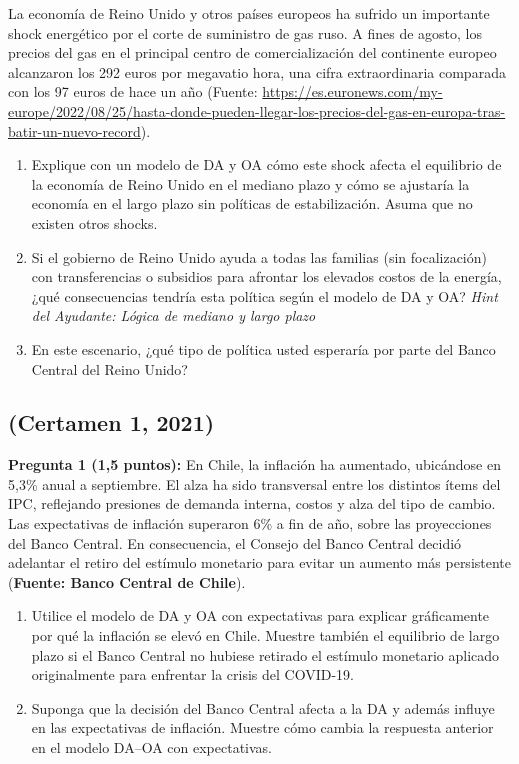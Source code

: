 \documentclass[11pt,addpoints]{article}
\begin{document}
La economía de Reino Unido y otros países europeos ha sufrido un importante shock energético por el corte de suministro de gas ruso. A fines de agosto, los precios del gas en el principal centro de comercialización del continente europeo alcanzaron los 292 euros por megavatio hora, una cifra extraordinaria comparada con los 97 euros de hace un año (Fuente: \url{https://es.euronews.com/my-europe/2022/08/25/hasta-donde-pueden-llegar-los-precios-del-gas-en-europa-tras-batir-un-nuevo-record}).  
\newpage
\vspace*{0.1cm}
\begin{enumerate}[label=\alph*)]
    \item Explique con un modelo de DA y OA cómo este shock afecta el equilibrio de la economía de Reino Unido en el mediano plazo y cómo se ajustaría la economía en el largo plazo sin políticas de estabilización. Asuma que no existen otros shocks.  
    \item Si el gobierno de Reino Unido ayuda a todas las familias (sin focalización) con transferencias o subsidios para afrontar los elevados costos de la energía, ¿qué consecuencias tendría esta política según el modelo de DA y OA? \textit{Hint del Ayudante: Lógica de mediano y largo plazo}
    \item En este escenario, ¿qué tipo de política usted esperaría por parte del Banco Central del Reino Unido?  
\end{enumerate}



\subsection*{(Certamen 1, 2021)}
\textbf{Pregunta 1 (1,5 puntos):}  
En Chile, la inflación ha aumentado, ubicándose en 5,3\% anual a septiembre. El alza ha sido transversal entre los distintos ítems del IPC, reflejando presiones de demanda interna, costos y alza del tipo de cambio. Las expectativas de inflación superaron 6\% a fin de año, sobre las proyecciones del Banco Central. En consecuencia, el Consejo del Banco Central decidió adelantar el retiro del estímulo monetario para evitar un aumento más persistente (\textbf{Fuente: Banco Central de Chile}).  

\begin{enumerate}[label=\alph*)]
    \item Utilice el modelo de DA y OA con expectativas para explicar gráficamente por qué la inflación se elevó en Chile. Muestre también el equilibrio de largo plazo si el Banco Central no hubiese retirado el estímulo monetario aplicado originalmente para enfrentar la crisis del COVID-19.  
    \item Suponga que la decisión del Banco Central afecta a la DA y además influye en las expectativas de inflación. Muestre cómo cambia la respuesta anterior en el modelo DA--OA con expectativas.  
\end{enumerate}
\end{document}
